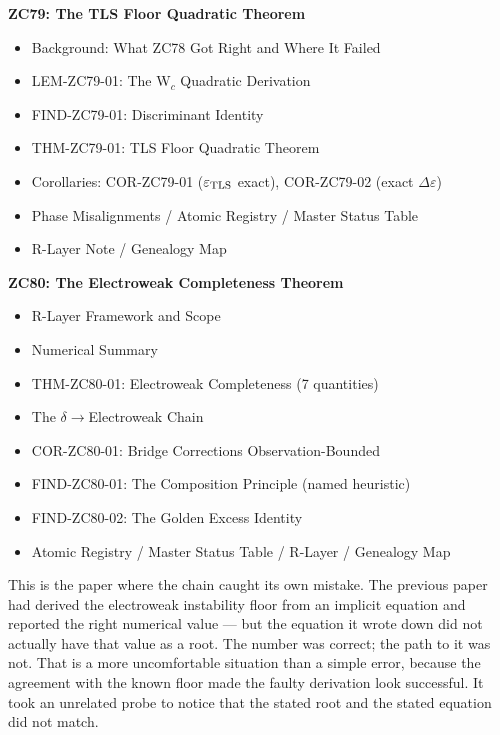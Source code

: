 \documentclass[12pt, a4paper]{article}
\begin{document}
\begin{contentsbox}[title={Part L --- Part and Section Headers}]
\textbf{ZC79: The TLS Floor Quadratic Theorem}
\begin{itemize}[noitemsep, leftmargin=1.5em]
  \item Background: What ZC78 Got Right and Where It Failed
  \item LEM-ZC79-01: The W$_c$ Quadratic Derivation
  \item FIND-ZC79-01: Discriminant Identity
  \item THM-ZC79-01: TLS Floor Quadratic Theorem
  \item Corollaries: COR-ZC79-01 ($\varepsilon_{\rm TLS}$ exact),
    COR-ZC79-02 (exact $\Delta\varepsilon$)
  \item Phase Misalignments / Atomic Registry / Master Status Table
  \item R-Layer Note / Genealogy Map
\end{itemize}

\textbf{ZC80: The Electroweak Completeness Theorem}
\begin{itemize}[noitemsep, leftmargin=1.5em]
  \item R-Layer Framework and Scope
  \item Numerical Summary
  \item THM-ZC80-01: Electroweak Completeness (7 quantities)
  \item The $\delta\to$Electroweak Chain
  \item COR-ZC80-01: Bridge Corrections Observation-Bounded
  \item FIND-ZC80-01: The Composition Principle (named heuristic)
  \item FIND-ZC80-02: The Golden Excess Identity
  \item Atomic Registry / Master Status Table / R-Layer / Genealogy Map
\end{itemize}
\end{contentsbox}

\newpage

This is the paper where the chain caught its own mistake. The previous paper
had derived the electroweak instability floor from an implicit equation and
reported the right numerical value --- but the equation it wrote down did not
actually have that value as a root. The number was correct; the path to it was
not. That is a more uncomfortable situation than a simple error, because the
agreement with the known floor made the faulty derivation look successful. It
took an unrelated probe to notice that the stated root and the stated equation
did not match.
\end{document}
